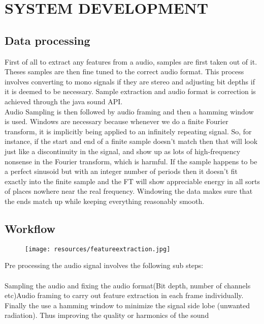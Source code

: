\newpage
\section{SYSTEM DEVELOPMENT}
\subsection{Data processing}
First of all to extract any features from a audio, samples are first taken out of it. Theses samples are then fine tuned to the correct audio format. This process involves converting to mono signals if they are stereo and adjusting bit depths if it is deemed to be necessary. Sample extraction and audio format is correction is achieved through the java sound API.\\
Audio Sampling is then followed by audio framing and then a hamming window is used. Windows are necessary because whenever we do a finite Fourier transform, it is implicitly being applied to an infinitely repeating signal. So, for instance, if the start and end of a finite sample doesn’t match then that will look just like a discontinuity in the signal, and show up as lots of high-frequency nonsense in the Fourier transform, which is harmful. If the sample happens to be a perfect sinusoid but with an integer number of periods then it doesn't fit exactly into the finite sample and the FT will show appreciable energy in all sorts of places nowhere near the real frequency. Windowing the data makes sure that the ends match up while keeping everything reasonably smooth.
\subsection{Workflow}
        \begin{figure}[t]
            \centering
            \texttt{[image: resources/featureextraction.jpg]}
        \end{figure}
\newpage
    Pre processing the audio signal involves the following sub steps:\\
    \paragraph{}
    Sampling the audio and fixing the audio format(Bit depth, number of channels etc)Audio framing to carry out feature extraction in each frame individually. Finally the use a hamming window to minimize the signal side lobe (unwanted radiation). Thus improving the quality or harmonics of the sound

